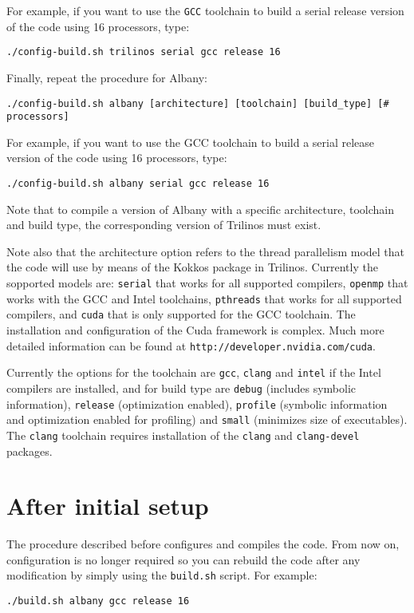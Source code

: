 \documentclass[10pt,a4paper]{article} \usepackage[utf8]{inputenc}
\begin{document}
For example, if you want to use the \verb+GCC+ toolchain to build a
serial release version of the code using 16 processors, type:
\begin{verbatim}
./config-build.sh trilinos serial gcc release 16
\end{verbatim}

Finally, repeat the procedure for Albany:
\begin{verbatim}
./config-build.sh albany [architecture] [toolchain] [build_type] [# processors]
\end{verbatim}

For example, if you want to use the GCC toolchain to build a
serial release version of the code using 16 processors, type:
\begin{verbatim}
./config-build.sh albany serial gcc release 16
\end{verbatim}

Note that to compile a version of Albany with a specific architecture,
toolchain and build type, the corresponding version of Trilinos must
exist.

Note also that the architecture option refers to the thread
parallelism model that the code will use by means of the Kokkos
package in Trilinos. Currently the sopported models are: \verb+serial+
that works for all supported compilers, \verb+openmp+ that works with
the GCC and Intel toolchains, \verb+pthreads+ that works for all
supported compilers, and \verb+cuda+ that is only supported for the
GCC toolchain. The installation and configuration of the Cuda
framework is complex. Much more detailed information can be found at
\verb+http://developer.nvidia.com/cuda+.

Currently the options for the toolchain are \verb+gcc+, \verb+clang+
and \verb+intel+ if the Intel compilers are installed, and for build
type are \verb+debug+ (includes symbolic information), \verb+release+
(optimization enabled), \verb+profile+ (symbolic information and
optimization enabled for profiling) and \verb+small+ (minimizes size
of executables). The \verb+clang+ toolchain requires installation of
the \verb+clang+ and \verb+clang-devel+ packages.

\section{After initial setup}
The procedure described before configures and compiles the code. From
now on, configuration is no longer required so you can rebuild the
code after any modification by simply using the \verb+build.sh+
script. For example:
\begin{verbatim}
./build.sh albany gcc release 16
\end{verbatim}
\end{document}
